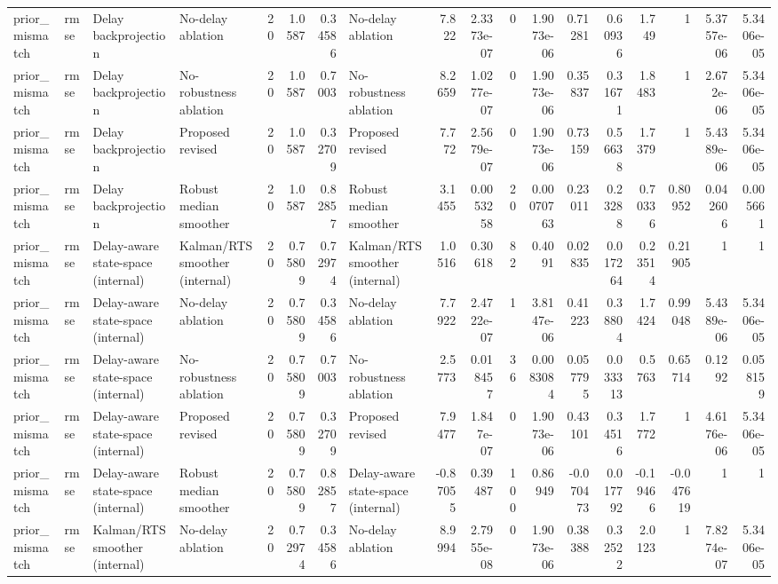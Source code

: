 \begin{table}[!htbp]
{\begin{tabular}{llllrrrlrrrrrrrrrr}
prior_mismatch & rmse & Delay backprojection & No-delay ablation & 20 & 1.0587 & 0.34586 & No-delay ablation & 7.822 & 2.3373e-07 & 0 & 1.9073e-06 & 0.71281 & 0.60936 & 1.749 & 1 & 5.3757e-06 & 5.3406e-05 \\
prior_mismatch & rmse & Delay backprojection & No-robustness ablation & 20 & 1.0587 & 0.7003 & No-robustness ablation & 8.2659 & 1.0277e-07 & 0 & 1.9073e-06 & 0.35837 & 0.31671 & 1.8483 & 1 & 2.672e-06 & 5.3406e-05 \\
prior_mismatch & rmse & Delay backprojection & Proposed revised & 20 & 1.0587 & 0.32709 & Proposed revised & 7.772 & 2.5679e-07 & 0 & 1.9073e-06 & 0.73159 & 0.56638 & 1.7379 & 1 & 5.4389e-06 & 5.3406e-05 \\
prior_mismatch & rmse & Delay backprojection & Robust median smoother & 20 & 1.0587 & 0.82857 & Robust median smoother & 3.1455 & 0.0053258 & 20 & 0.00070763 & 0.23011 & 0.23288 & 0.70336 & 0.80952 & 0.042606 & 0.005661 \\
prior_mismatch & rmse & Delay-aware state-space (internal) & Kalman/RTS smoother (internal) & 20 & 0.75809 & 0.72974 & Kalman/RTS smoother (internal) & 1.0516 & 0.30618 & 82 & 0.4091 & 0.02835 & 0.017264 & 0.23514 & 0.21905 & 1 & 1 \\
prior_mismatch & rmse & Delay-aware state-space (internal) & No-delay ablation & 20 & 0.75809 & 0.34586 & No-delay ablation & 7.7922 & 2.4722e-07 & 1 & 3.8147e-06 & 0.41223 & 0.38804 & 1.7424 & 0.99048 & 5.4389e-06 & 5.3406e-05 \\
prior_mismatch & rmse & Delay-aware state-space (internal) & No-robustness ablation & 20 & 0.75809 & 0.7003 & No-robustness ablation & 2.5773 & 0.018457 & 36 & 0.0083084 & 0.057795 & 0.033313 & 0.5763 & 0.65714 & 0.1292 & 0.058159 \\
prior_mismatch & rmse & Delay-aware state-space (internal) & Proposed revised & 20 & 0.75809 & 0.32709 & Proposed revised & 7.9477 & 1.847e-07 & 0 & 1.9073e-06 & 0.43101 & 0.34516 & 1.7772 & 1 & 4.6176e-06 & 5.3406e-05 \\
prior_mismatch & rmse & Delay-aware state-space (internal) & Robust median smoother & 20 & 0.75809 & 0.82857 & Delay-aware state-space (internal) & -0.87055 & 0.39487 & 100 & 0.86949 & -0.070473 & 0.017792 & -0.19466 & -0.047619 & 1 & 1 \\
prior_mismatch & rmse & Kalman/RTS smoother (internal) & No-delay ablation & 20 & 0.72974 & 0.34586 & No-delay ablation & 8.9994 & 2.7955e-08 & 0 & 1.9073e-06 & 0.38388 & 0.32522 & 2.0123 & 1 & 7.8274e-07 & 5.3406e-05 \\

\end{tabular}}
\end{table}
